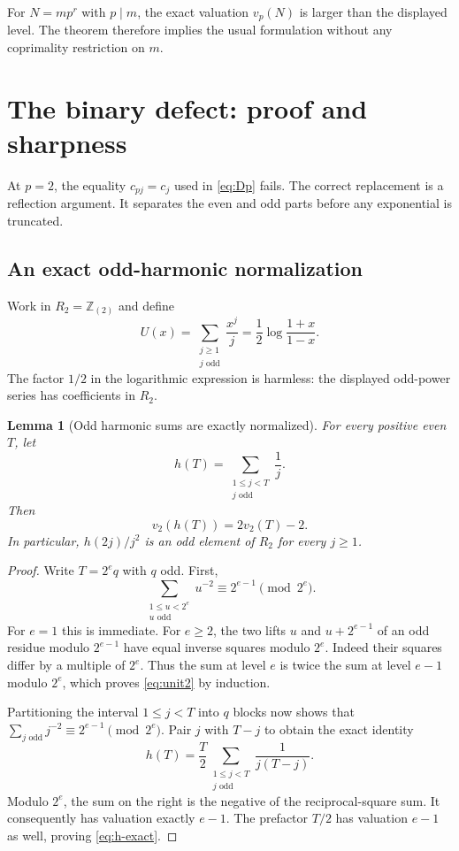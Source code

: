 \documentclass[11pt,a4paper]{article}
\numberwithin{equation}{section}
\newtheorem{lemma}[theorem]{Lemma}
\theoremstyle{definition}
\theoremstyle{remark}
\newcommand{\Z}{\mathbb Z}
\begin{document}
For $N=mp^r$ with $p\mid m$, the exact valuation $v_p(N)$ is larger than
the displayed level. The theorem therefore implies the usual formulation
without any coprimality restriction on $m$.

\section{The binary defect: proof and sharpness}
\label{sec:binary}

At $p=2$, the equality $c_{pj}=c_j$ used in \eqref{eq:Dp} fails. The correct
replacement is a reflection argument. It separates the even and odd parts
before any exponential is truncated.

\subsection{An exact odd-harmonic normalization}
Work in $R_2=\Z_{(2)}$ and define
\begin{equation}\label{eq:U}
 U(x)=\sum_{\substack{j\ge1\\j\text{ odd}}}\frac{x^j}{j}
     =\frac12\log\frac{1+x}{1-x}.
\end{equation}
The factor $1/2$ in the logarithmic expression is harmless: the displayed
odd-power series has coefficients in $R_2$.

\begin{lemma}[Odd harmonic sums are exactly normalized]\label{lem:binary-H}
For every positive even $T$, let
\[
 h(T)=\sum_{\substack{1\le j<T\\j\text{ odd}}}\frac1j.
\]
Then
\begin{equation}\label{eq:h-exact}
 v_2(h(T))=2v_2(T)-2.
\end{equation}
In particular, $h(2j)/j^2$ is an odd element of $R_2$ for every $j\ge1$.
\end{lemma}
\begin{proof}
Write $T=2^e q$ with $q$ odd. First,
\begin{equation}\label{eq:unit2}
 \sum_{\substack{1\le u<2^e\\u\text{ odd}}}u^{-2}
 \equiv2^{e-1}\pmod{2^e}.
\end{equation}
For $e=1$ this is immediate. For $e\ge2$, the two lifts $u$ and
$u+2^{e-1}$ of an odd residue modulo $2^{e-1}$ have equal inverse squares
modulo $2^e$. Indeed their squares differ by a multiple of $2^e$.
Thus the sum at level $e$ is twice the sum at level $e-1$ modulo $2^e$,
which proves \eqref{eq:unit2} by induction.

Partitioning the interval $1\le j<T$ into $q$ blocks now shows that
$\sum_{j\text{ odd}}j^{-2}\equiv2^{e-1}\pmod{2^e}$. Pair $j$ with
$T-j$ to obtain the exact identity
\[
 h(T)=\frac T2
 \sum_{\substack{1\le j<T\\j\text{ odd}}}\frac1{j(T-j)}.
\]
Modulo $2^e$, the sum on the right is the negative of the reciprocal-square
sum. It consequently has valuation exactly $e-1$. The prefactor $T/2$
has valuation $e-1$ as well, proving \eqref{eq:h-exact}.
\end{proof}
\end{document}
